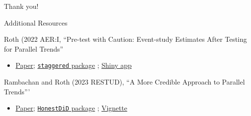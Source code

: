 \documentclass[aspectratio = 169, 13pt]{beamer}
\begin{document}





    



\appendix


\begin{frame}
	\centering
	Thank you!
\end{frame}


\begin{frame}{Additional Resources}
	\begin{wideitemize}
		\item
		Roth (2022 AER:I, ``Pre-test with Caution: Event-study Estimates After Testing for Parallel Trends''
		\begin{itemize}
			\item 
			      \href{https://jonathandroth.github.io/assets/files/roth_pretrends_testing.pdf}{Paper}; \href{https://github.com/jonathandroth/pretrends}{\texttt{staggered} package} ; \href{https://github.com/jonathandroth/PretrendsPower\#pretrendspower}{Shiny app}
		\end{itemize}
		    
		\item
		Rambachan and Roth (2023 RESTUD), ``A More Credible Approach to Parallel Trends'''
		\begin{itemize}
			\item 
			      \href{https://jonathandroth.github.io/assets/files/HonestParallelTrends_Main.pdf}{Paper}; \href{https://github.com/asheshrambachan/HonestDiD}{\texttt{HonestDiD} package} ; \href{https://github.com/asheshrambachan/HonestDiD/blob/master/doc/HonestDiD_Example.pdf}{Vignette}
		\end{itemize}
	\end{wideitemize}
\end{frame}
\end{document}
